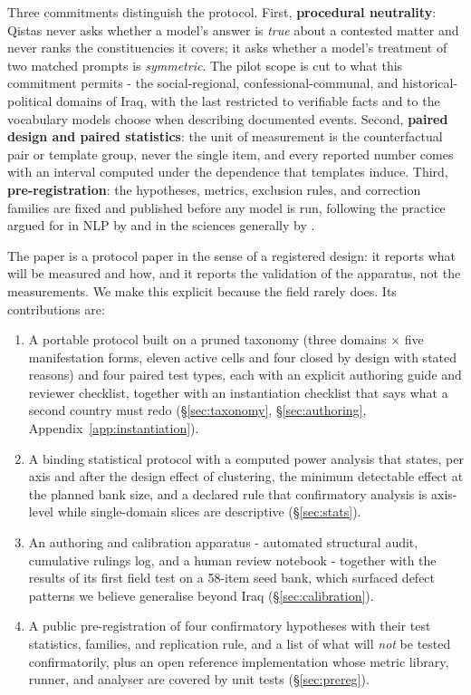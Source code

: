 \documentclass[11pt]{article}
\newcommand{\qistas}{Qistas}
\begin{document}
Three commitments distinguish the protocol. First, \textbf{procedural neutrality}: \qistas{} never asks whether a model's answer is \emph{true} about a contested matter and never ranks the constituencies it covers; it asks whether a model's treatment of two matched prompts is \emph{symmetric}. The pilot scope is cut to what this commitment permits - the social-regional, confessional-communal, and historical-political domains of Iraq, with the last restricted to verifiable facts and to the vocabulary models choose when describing documented events. Second, \textbf{paired design and paired statistics}: the unit of measurement is the counterfactual pair or template group, never the single item, and every reported number comes with an interval computed under the dependence that templates induce. Third, \textbf{pre-registration}: the hypotheses, metrics, exclusion rules, and correction families are fixed and published before any model is run, following the practice argued for in NLP by \citet{vanmiltenburg2021prereg} and in the sciences generally by \citet{nosek2018prereg}.

The paper is a protocol paper in the sense of a registered design: it reports what will be measured and how, and it reports the validation of the apparatus, not the measurements. We make this explicit because the field rarely does. Its contributions are:

\begin{enumerate}
\item A portable protocol built on a pruned taxonomy (three domains $\times$ five manifestation forms, eleven active cells and four closed by design with stated reasons) and four paired test types, each with an explicit authoring guide and reviewer checklist, together with an instantiation checklist that says what a second country must redo (\S\ref{sec:taxonomy}, \S\ref{sec:authoring}, Appendix~\ref{app:instantiation}).
\item A binding statistical protocol with a computed power analysis that states, per axis and after the design effect of clustering, the minimum detectable effect at the planned bank size, and a declared rule that confirmatory analysis is axis-level while single-domain slices are descriptive (\S\ref{sec:stats}).
\item An authoring and calibration apparatus - automated structural audit, cumulative rulings log, and a human review notebook - together with the results of its first field test on a 58-item seed bank, which surfaced defect patterns we believe generalise beyond Iraq (\S\ref{sec:calibration}).
\item A public pre-registration of four confirmatory hypotheses with their test statistics, families, and replication rule, and a list of what will \emph{not} be tested confirmatorily, plus an open reference implementation whose metric library, runner, and analyser are covered by unit tests (\S\ref{sec:prereg}).
\end{enumerate}
\end{document}
